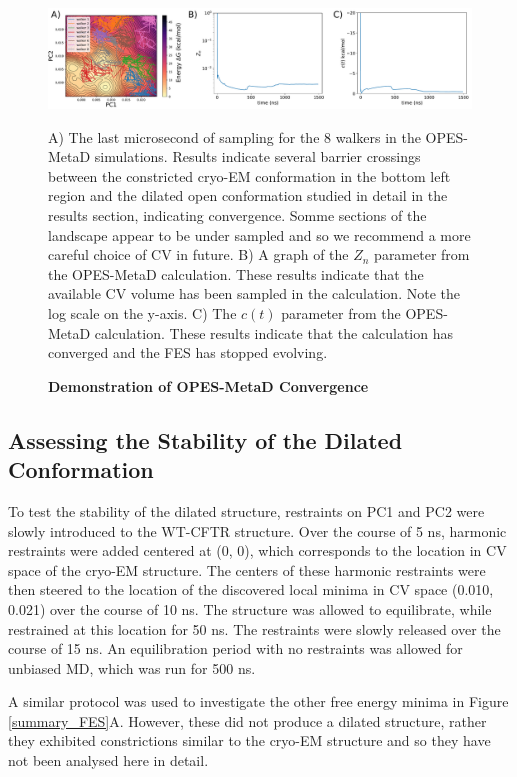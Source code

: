 \begin{figure}
	\begin{center}
		\includegraphics[width=1\textwidth]{figures/opening/FES_mw_trace.pdf}
	\end{center}
	\captionsetup{singlelinecheck = false, justification=raggedright}
	\caption[Demonstration of OPES-MetaD Convergence ] {\textbf{Demonstration of OPES-MetaD Convergence}}{A) The last microsecond of sampling for the 8 walkers in the OPES-MetaD simulations. Results indicate several barrier crossings between the constricted cryo-EM conformation in the bottom left region and the dilated open conformation studied in detail in the results section, indicating convergence. Somme sections of the landscape appear to be under sampled and so we recommend a more careful choice of CV in future. B) A graph of the $Z_n$ parameter from the OPES-MetaD calculation. These results indicate that the available CV volume has been sampled in the calculation. Note the log scale on the y-axis. C) The $c(t)$ parameter from the OPES-MetaD calculation. These results indicate that the calculation has converged and the FES has stopped evolving. }
	\label{convergence_3}
\end{figure}

\subsection{Assessing the Stability of the Dilated Conformation}
To test the stability of the dilated structure, restraints on PC1 and PC2 were slowly introduced to the WT-CFTR structure. Over the course of 5 ns, harmonic restraints were added centered at (0, 0), which corresponds to the location in CV space of the cryo-EM structure. The centers of these harmonic restraints were then steered to the location of the discovered local minima in CV space (0.010, 0.021) over the course of 10 ns. The structure was allowed to equilibrate, while restrained at this location for 50 ns. The restraints were slowly released over the course of 15 ns. An equilibration period with no restraints was allowed for unbiased MD, which was run for 500 ns.

A similar protocol was used to investigate the other free energy minima in Figure \ref{summary_FES}A. However, these did not produce a dilated structure, rather they exhibited constrictions similar to the cryo-EM structure and so they have not been analysed here in detail.

